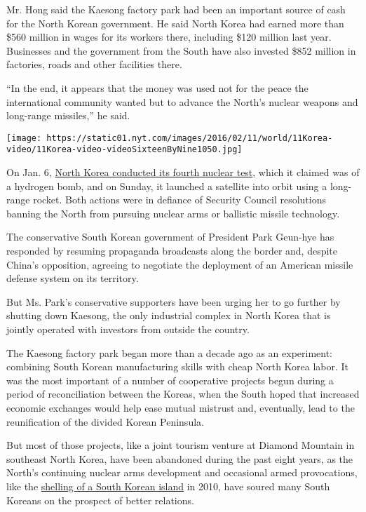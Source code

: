 Mr. Hong said the Kaesong factory park had been an important source of
cash for the North Korean government. He said North Korea had earned
more than \$560 million in wages for its workers there, including \$120
million last year. Businesses and the government from the South have
also invested \$852 million in factories, roads and other facilities
there.

``In the end, it appears that the money was used not for the peace the
international community wanted but to advance the North's nuclear
weapons and long-range missiles,'' he said.

\texttt{[image: https://static01.nyt.com/images/2016/02/11/world/11Korea-video/11Korea-video-videoSixteenByNine1050.jpg]}

On Jan. 6,
\href{http://www.nytimes.com/2016/01/06/world/asia/north-korea-hydrogen-bomb-test.html}{North
Korea conducted its fourth nuclear test}, which it claimed was of a
hydrogen bomb, and on Sunday, it launched a satellite into orbit using a
long-range rocket. Both actions were in defiance of Security Council
resolutions banning the North from pursuing nuclear arms or ballistic
missile technology.

The conservative South Korean government of President Park Geun-hye has
responded by resuming propaganda broadcasts along the border and,
despite China's opposition, agreeing to negotiate the deployment of an
American missile defense system on its territory.

But Ms. Park's conservative supporters have been urging her to go
further by shutting down Kaesong, the only industrial complex in North
Korea that is jointly operated with investors from outside the country.

The Kaesong factory park began more than a decade ago as an experiment:
combining South Korean manufacturing skills with cheap North Korea
labor. It was the most important of a number of cooperative projects
begun during a period of reconciliation between the Koreas, when the
South hoped that increased economic exchanges would help ease mutual
mistrust and, eventually, lead to the reunification of the divided
Korean Peninsula.

But most of those projects, like a joint tourism venture at Diamond
Mountain in southeast North Korea, have been abandoned during the past
eight years, as the North's continuing nuclear arms development and
occasional armed provocations, like the
\href{http://www.nytimes.com/2010/11/24/world/asia/24korea.html}{shelling
of a South Korean island} in 2010, have soured many South Koreans on the
prospect of better relations.

